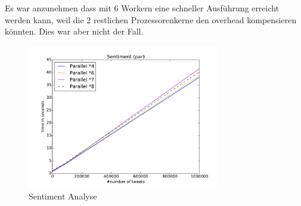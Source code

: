 \documentclass[12pt, oneside]{report}   	%
\begin{document}
Es war anzunehmen dass mit 6 Workern eine schneller Ausführung erreicht werden kann, weil die 2 restlichen Prozessorenkerne den overhead kompensieren könnten. Dies war aber nicht der Fall.

\begin{figure}[htbp]
\begin{center}
\includegraphics[width=0.75\textwidth]{bilder/time_senitment_par.pdf}
\caption{Sentiment Analyse}
\label{img:performancesentiment}
\end{center}
\end{figure}

\end{document}
